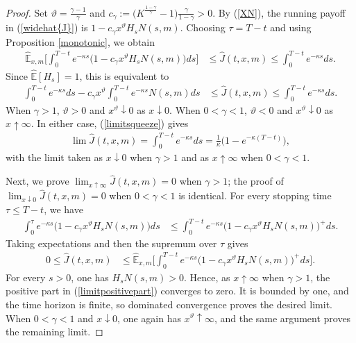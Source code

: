 \documentclass[a4paper,11pt]{amsart}
\numberwithin{equation}{section}
\begin{document}
{\begin{proof}
Set $\vartheta=\frac{\gamma-1}{\gamma}$ and $c_\gamma:=\big(K^{\frac{1-\gamma}{\gamma}}-1\big)\frac{\gamma}{1-\gamma}>0$. By (\ref{XN}), the running payoff in (\ref{widehat{J}}) is $1-c_\gamma x^\vartheta H_sN(s,m)$. Choosing $\tau=T-t$ and using Proposition \ref{monotonic}, we obtain
\begin{align*}
\widehat{\mathbb E}_{x,m}\bigg[\int_0^{T-t}e^{-\kappa s}\big(1-c_\gamma x^\vartheta H_sN(s,m)\big)ds\bigg]&\leq\widehat J(t,x,m)\leq\int_0^{T-t}e^{-\kappa s}ds.
\end{align*}
Since $\widehat{\mathbb E}[H_s]=1$, this is equivalent to
\begin{align}\label{limitsqueeze}
\int_0^{T-t}e^{-\kappa s}ds-c_\gamma x^\vartheta\int_0^{T-t}e^{-\kappa s}N(s,m)ds&\leq\widehat J(t,x,m)\leq\int_0^{T-t}e^{-\kappa s}ds.
\end{align}
When $\gamma>1$, $\vartheta>0$ and $x^\vartheta\downarrow0$ as $x\downarrow0$. When $0<\gamma<1$, $\vartheta<0$ and $x^\vartheta\downarrow0$ as $x\uparrow\infty$. In either case, (\ref{limitsqueeze}) gives
\begin{align*}
\lim\widehat J(t,x,m)=\int_0^{T-t}e^{-\kappa s}ds=\frac{1}{\kappa}\big(1-e^{-\kappa(T-t)}\big),
\end{align*}
with the limit taken as $x\downarrow0$ when $\gamma>1$ and as $x\uparrow\infty$ when $0<\gamma<1$.

\color{black}Next, we prove $\lim_{x\uparrow\infty}\widehat J(t,x,m)=0$ when $\gamma>1$; the proof of $\lim_{x\downarrow0}\widehat J(t,x,m)=0$ when $0<\gamma<1$ is identical. For every stopping time $\tau\leq T-t$, we have
\begin{align*}
\int_0^\tau e^{-\kappa s}\big(1-c_\gamma x^\vartheta H_sN(s,m)\big)ds&\leq\int_0^{T-t}e^{-\kappa s}\big(1-c_\gamma x^\vartheta H_sN(s,m)\big)^+ds.
\end{align*}
Taking expectations and then the supremum over $\tau$ gives
\begin{align}\label{limitpositivepart}
0\leq\widehat J(t,x,m)&\leq\widehat{\mathbb E}_{x,m}\bigg[\int_0^{T-t}e^{-\kappa s}\big(1-c_\gamma x^\vartheta H_sN(s,m)\big)^+ds\bigg].
\end{align}
For every $s>0$, one has $H_sN(s,m)>0$. Hence, as $x\uparrow\infty$ when $\gamma>1$, the positive part in (\ref{limitpositivepart}) converges to zero. It is bounded by one, and the time horizon is finite, so dominated convergence proves the desired limit. When $0<\gamma<1$ and $x\downarrow0$, one again has $x^\vartheta\uparrow\infty$, and the same argument proves the remaining limit.
\end{proof}






}
\end{document}
